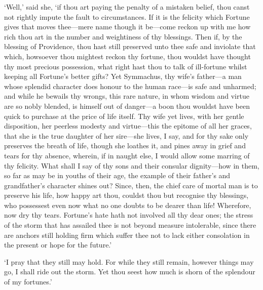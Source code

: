 \documentclass[12pt]{book}
\begin{document}
`Well,' said she, `if thou art paying the penalty of a mistaken belief,
thou canst not rightly impute the fault to circumstances. If it is the
felicity which Fortune gives that moves thee---mere name though it
be---come reckon up with me how rich thou art in the number and
weightiness of thy blessings. Then if, by the blessing of Providence,
thou hast still preserved unto thee safe and inviolate that which,
howsoever thou mightest reckon thy fortune, thou wouldst have thought
thy most precious possession, what right hast thou to talk of
ill-fortune whilst keeping all Fortune's better gifts? Yet Symmachus,
thy wife's father---a man whose splendid character does honour to the
human race---is safe and unharmed; and while he bewails thy wrongs, this
rare nature, in whom wisdom and virtue are so nobly blended, is himself
out of danger---a boon thou wouldst have been quick to purchase at the
price of life itself. Thy wife yet lives, with her gentle disposition,
her peerless modesty and virtue---this the epitome of all her graces,
that she is the true daughter of her sire---she lives, I say, and for thy
sake only preserves the breath of life, though she loathes it, and pines
away in grief and tears for thy absence, wherein, if in naught else, I
would allow some marring of thy felicity. What shall I say of thy sons
and their consular dignity---how in them, so far as may be in youths of
their age, the example of their father's and grandfather's character
shines out? Since, then, the chief care of mortal man is to preserve his
life, how happy art thou, couldst thou but recognise thy blessings, who
possessest even now what no one doubts to be dearer than life!
Wherefore, now dry thy tears. Fortune's hate hath not involved all thy
dear ones; the stress of the storm that has assailed thee is not beyond
measure intolerable, since there are anchors still holding firm which
suffer thee not to lack either consolation in the present or hope for
the future.'

`I pray that they still may hold. For while they still remain, however
things may go, I shall ride out the storm. Yet thou seest how much is
shorn of the splendour of my fortunes.'
\end{document}
